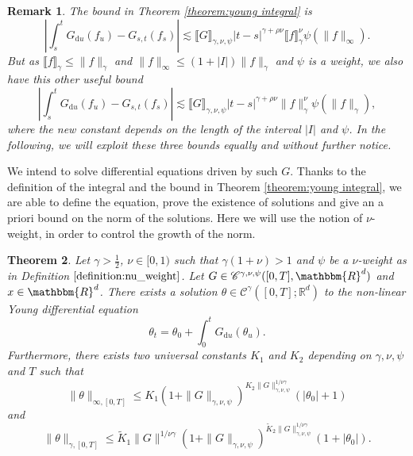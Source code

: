 \documentclass[a4paper,11pt]{article}
\newcommand{\mathd}{\mathrm{d}}
\newtheorem{theorem}{Theorem}[section]
\newtheorem{remark}[theorem]{Remark}
\newcommand{\CC}{\mathscr C}
\newcommand{\RR}{\mathbb R}
\begin{document}
\begin{remark}
  The bound in Theorem \ref{theorem:young integral} is
  \[ \left\lvert \int_{s}^{t} G_{\mathd u} ( f_{u} ) -G_{s,t} ( f_{s} ) \right\lvert
     \lesssim \llbracket G \rrbracket_{\gamma , \nu , \psi} | t-s |^{\gamma +
     \rho \nu} \llbracket f \rrbracket_{\gamma}^{\nu} \psi ( \| f \|_{\infty}
     ) . \]
  But as $\llbracket f \rrbracket_{\gamma} \leqslant \| f \|_{\gamma}$ and $\|
  f \|_{\infty} \leqslant ( 1+ | I | ) \| f \|_{\gamma}$ and $\psi$ is a
  weight, we also have this other useful bound
  \[ \left\lvert \int_{s}^{t} G_{\mathd u} ( f_{u} ) -G_{s,t} ( f_{s} ) \right\lvert
     \lesssim \llbracket G \rrbracket_{\gamma , \nu , \psi} | t-s |^{\gamma +
     \rho \nu} \| f \|_{\gamma}^{\nu} \psi ( \| f \|_{\gamma} ) ,\]
  where the new constant depends on the length of the interval $| I |$ and
  $\psi$. In the following, we will exploit these three bounds equally
  and without further notice.
\end{remark}

We intend to solve differential equations driven by such $G$. Thanks to the
definition of the integral and the bound in Theorem \ref{theorem:young
integral}, we are able to define the equation, prove the existence of
solutions and give an a priori bound on the norm of the solutions. Here we
will use the notion of $\nu$-weight, in order to control the growth of the
norm.

\begin{theorem}
  \label{theorem:existence_young_solution}Let $\gamma > \frac{1}{2}$, $\nu \in
  [ 0,1 )$ such that $\gamma ( 1+ \nu ) >1$ and $\psi$ be a $\nu$-weight as in
  Definition $\ref{definition:nu_weight}$. Let $G \in \CC^{\gamma , \nu ,
  \psi} ( [ 0,T ] ,\mathbbm{R}^{d} )$ and $x \in \mathbbm{R}^{d}$. There
  exists a solution $\theta\in\CC^{\gamma}([0,T];\RR^d)$ to the non-linear Young differential equation
  \[ \theta_{t} = \theta_{0} + \int_{0}^{t} G_{\mathd u} ( \theta_{u} ) . \]
  Furthermore, there exists two universal constants $K_{1}$ and $K_{2}$
  depending on $\gamma , \nu , \psi$ and $T$ such that
  \[ \| \theta \|_{\infty , [ 0,T ]} \leqslant K_{1} ( 1+ \| G \|_{\gamma ,
     \nu , \psi} )^{K_{2} \| G \|_{\gamma , \nu , \psi}^{1/ \nu \gamma}} ( |
     \theta_{0} | +1 ) \]
  and
  \[ \| \theta \|_{\gamma , [ 0,T ]} \leqslant \tilde{K}_{1} \| G \|^{1/ \nu
     \gamma} ( 1+ \| G \|_{\gamma , \nu , \psi} )^{\tilde{K}_{2} \| G
     \|_{\gamma , \nu , \psi}^{1/ \nu \gamma}} ( 1+ | \theta_{0} | ) . \]
\end{theorem}
\end{document}
